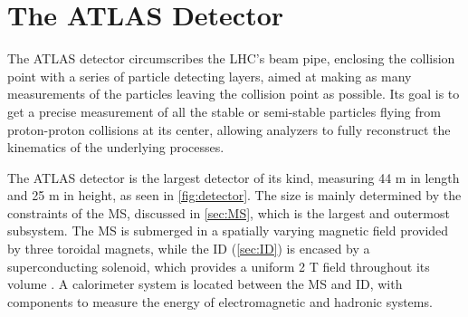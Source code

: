 
\chapter{The ATLAS Detector} %

\label{ch:atlas} %

The \ac{ATLAS} detector circumscribes the \ac{LHC}'s beam pipe, enclosing the collision point with a series of particle detecting layers, aimed at making as many measurements of the particles leaving the collision point as possible. Its goal is to get a precise measurement of all the stable or semi-stable particles flying from proton-proton collisions at its center, allowing analyzers to fully reconstruct the kinematics of the underlying processes.

The \ac{ATLAS} detector is the largest detector of its kind, measuring 44 m in length and 25 m in height, as seen in \autoref{fig:detector}. The size is mainly determined by the constraints of the \acf{MS}, discussed in \autoref{sec:MS}, which is the largest and outermost subsystem. The \ac{MS} is submerged in a spatially varying magnetic field provided by three toroidal magnets, while the \acf{ID} (\autoref{sec:ID}) is encased by a superconducting solenoid, which provides a uniform 2 T field throughout its volume \cite{PERF-2007-01}. A calorimeter system is located between the \ac{MS} and \ac{ID}, with components to measure the energy of electromagnetic and hadronic systems. 

